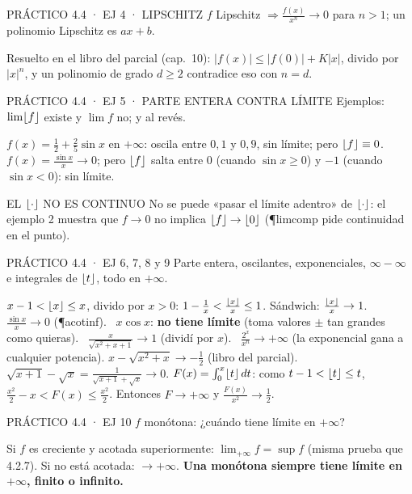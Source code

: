 \begin{enunciado}{PRÁCTICO 4.4 · EJ 4 · LIPSCHITZ}
$f$ Lipschitz $\Rightarrow\frac{f(x)}{x^n}\to0$ para $n>1$; un polinomio Lipschitz es $ax+b$.
\end{enunciado}
Resuelto en el libro del parcial (cap.\ 10): $|f(x)|\le|f(0)|+K|x|$, divido por $|x|^n$, y un polinomio de grado $d\ge2$ contradice eso con $n=d$.

\begin{enunciado}{PRÁCTICO 4.4 · EJ 5 · PARTE ENTERA CONTRA LÍMITE}
Ejemplos: $\lim\lfloor f\rfloor$ existe y $\lim f$ no; y al revés.
\end{enunciado}
$f(x)=\frac12+\frac25\sin x$ en $+\infty$: oscila entre $0{,}1$ y $0{,}9$, sin límite; pero $\lfloor f\rfloor\equiv0$.\\
$f(x)=\frac{\sin x}x\to0$; pero $\lfloor f\rfloor$ salta entre 0 (cuando $\sin x\ge0$) y $-1$ (cuando $\sin x<0$): sin límite.
\begin{trampa}{EL $\lfloor \cdot\rfloor$ NO ES CONTINUO}
No se puede «pasar el límite adentro» de $\lfloor \cdot\rfloor$: el ejemplo 2 muestra que $f\to0$ no implica $\lfloor f\rfloor\to\lfloor 0\rfloor$ (\P{limcomp} pide continuidad en el punto).
\end{trampa}

\begin{enunciado}{PRÁCTICO 4.4 · EJ 6, 7, 8 y 9}
Parte entera, oscilantes, exponenciales, $\infty-\infty$ e integrales de $\lfloor t\rfloor$, todo en $+\infty$.
\end{enunciado}
$x-1<\lfloor x\rfloor\le x$, divido por $x>0$: $1-\frac1x<\frac{\lfloor x\rfloor}x\le1$. Sándwich: $\frac{\lfloor x\rfloor}x\to1$.
$\frac{\sin x}x\to0$ (\P{acotinf}). \ $x\cos x$: \textbf{no tiene límite} (toma valores $\pm$ tan grandes como quieras). \ $\frac x{\sqrt{x^2+x+1}}\to1$ (dividí por $x$). \ $\frac{2^x}{x^n}\to+\infty$ (la exponencial gana a cualquier potencia).
$x-\sqrt{x^2+x}\to-\frac12$ (libro del parcial). \ $\sqrt{x+1}-\sqrt x=\frac1{\sqrt{x+1}+\sqrt x}\to0$.
$F(x)=\int_0^x\lfloor t\rfloor\,dt$: como $t-1<\lfloor t\rfloor\le t$, $\frac{x^2}2-x<F(x)\le\frac{x^2}2$. Entonces $F\to+\infty$ y $\frac{F(x)}{x^2}\to\frac12$.

\begin{enunciado}{PRÁCTICO 4.4 · EJ 10}
$f$ monótona: ¿cuándo tiene límite en $+\infty$?
\end{enunciado}
Si $f$ es creciente y acotada superiormente: $\lim_{+\infty}f=\sup f$ (misma prueba que 4.2.7). Si no está acotada: $\to+\infty$. \textbf{Una monótona siempre tiene límite en $+\infty$, finito o infinito.}

